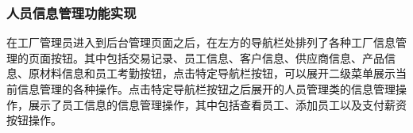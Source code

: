 \subsubsection{人员信息管理功能实现}

在工厂管理员进入到后台管理页面之后，在左方的导航栏处排列了各种工厂信息管理的页面按钮。其中包括交易记录、员工信息、客户信息、供应商信息、产品信息、原材料信息和员工考勤按钮，点击特定导航栏按钮，可以展开二级菜单展示当前信息管理的各种操作。点击特定导航栏按钮之后展开的人员管理类的信息管理操作，展示了员工信息的信息管理操作，其中包括查看员工、添加员工以及支付薪资按钮操作。




